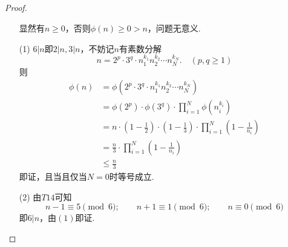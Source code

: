 \documentclass[UTF8]{ctexart}
\begin{document}
\subsection{}   %
\begin{proof}
    \begin{enumerate}
        \item []
        \item []显然有$n\geq 0$，否则$\phi (n) \geq 0 > n$，问题无意义.
        \item [(1)]$6|n$即$2|n,3|n$，不妨记$n$有素数分解
        \[
            n=2^{p}\cdot 3^{q} \cdot n_1^{k_1} n_2^{k_2} \cdots n_N^{k_N}.
            \quad
            (p,q \geq 1)
        \]
        则
        \begin{align*}
            \phi (n) 
            & = \phi (2^{p} \cdot 3^{q}\cdot n_1^{k_1} n_2^{k_2} \cdots n_N^{k_N}) \\
            & = \phi (2^{p})\cdot \phi (3^{q}) \cdot \prod\limits_{i=1}^{N} \phi (n_i^{k_i})\\
            & = n \cdot \displaystyle{\left(1-\frac{1}{2} \right) \cdot \left(1-\frac{1}{3}\right)\cdot \prod_{i=1}^{N} \left(1-\frac{1}{n_i}\right) }\\
            & = \displaystyle{\frac{n}{3} \cdot \prod_{i=1}^{N} \left(1-\frac{1}{n_i}\right)}\\
            & \leq \displaystyle{\frac{n}{3}}
        \end{align*}
        即证，且当且仅当$N=0$时等号成立.
        \item [(2)]由$T14$可知
        \[
            n-1 \equiv 5 \pmod{6} ; 
            \qquad
            n+1 \equiv 1 \pmod{6} ;
            \qquad
            n \equiv 0 \pmod{6}
        \]
        即$6|n$，由$(1)$即证.
    \end{enumerate}
\end{proof}
\end{document}

